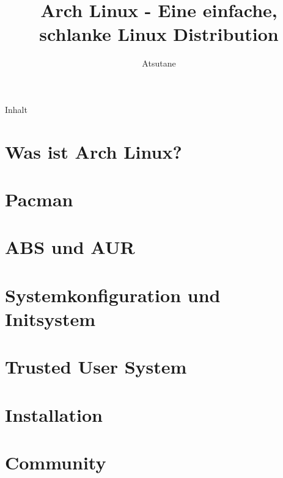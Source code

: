 \documentclass[mode=print,paper=screen,size=10pt,style=horatio]{powerdot}
\author{Atsutane}
\title{Arch Linux - Eine einfache, schlanke Linux Distribution}
\begin{document}
\maketitle
\begin{slide}{Inhalt}
  \tableofcontents[content=sections]
\end{slide}



\section{Was ist Arch Linux?}


\section{Pacman}


\section{ABS und AUR}


\section{Systemkonfiguration und Initsystem}


\section{Trusted User System}


\section{Installation}


\section{Community}
\end{document}
